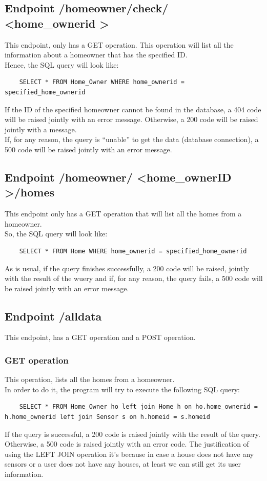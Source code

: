 \documentclass[a4paper,12pt]{article}
\begin{document}
\subsection*{Endpoint /homeowner/check/ \textless home\_ownerid \textgreater}
This endpoint, only has a GET operation. This operation will list all the information about a homeowner that has the specified ID.\\
Hence, the SQL query will look like:
\begin{lstlisting}
    SELECT * FROM Home_Owner WHERE home_ownerid = specified_home_ownerid
\end{lstlisting}
If the ID of the specified homeowner cannot be found in the database, a 404 code will be raised jointly with an error message. Otherwise, a 200 code will be raised jointly with a message.\\
If, for any reason, the query is “unable” to get the data (database connection), a 500 code will be raised jointly with an error message.
\subsection*{Endpoint /homeowner/ \textless home\_ownerID \textgreater /homes}
This endpoint only has a GET operation that will list all the homes from a homeowner.\\
So, the SQL query will look like:
\begin{lstlisting}
    SELECT * FROM Home WHERE home_ownerid = specified_home_ownerid
\end{lstlisting}
As is usual, if the query finishes successfully, a 200 code will be raised, jointly with the result of the wuery and if, for any reason, the query fails, a 500 code will be raised jointly with an error message.
\subsection*{Endpoint /alldata}
This endpoint, has a GET operation and a POST operation.
\subsubsection*{GET operation}
This operation, lists all the homes from a homeowner.\\
In order to do it, the program will try to execute the following SQL query:
\begin{lstlisting}
    SELECT * FROM Home_Owner ho left join Home h on ho.home_ownerid = h.home_ownerid left join Sensor s on h.homeid = s.homeid
\end{lstlisting}
If the query is successful, a 200 code is raised jointly with the result of the query. Otherwise, a 500 code is raised jointly with an error code.
The justification of using the LEFT JOIN operation it's because in case a house does not have any sensors or a user does not have any houses, at least we can still get its user information.
\end{document}
